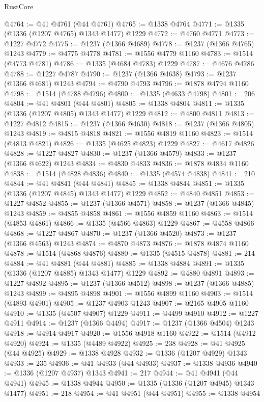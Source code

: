 \begin{lexlean}{RustCore}
\begin{coremodule}
@4764 := @41 @4761 (@44 @4761)
@4765 := @1338 @4764
@4771 := @1335 (@1336 (@1207 @4765) @1343 @1477) @1229
@4772 := @4760 @4771
@4773 := @1227 @4772
@4775 := @1237 (@1366 @4689)
@4778 := @1237 (@1366 @4765) @1243
@4779 := @4775 @4778
@4781 := @1556 @4779 @1160
@4783 := @1514 (@4773 @4781)
@4786 := @1335 (@4684 @4783) @1229
@4787 := @4676 @4786
@4788 := @1227 @4787
@4790 := @1237 (@1366 @4638)
@4793 := @1237 (@1366 @4681) @1243
@4794 := @4790 @4793
@4796 := @1878 @4794 @1160
@4798 := @1514 (@4788 @4796)
@4800 := @1335 (@4633 @4798)
@4801 := 206
@4804 := @41 @4801 (@44 @4801)
@4805 := @1338 @4804
@4811 := @1335 (@1336 (@1207 @4805) @1343 @1477) @1229
@4812 := @4800 @4811
@4813 := @1227 @4812
@4815 := @1237 (@1366 @4630)
@4818 := @1237 (@1366 @4805) @1243
@4819 := @4815 @4818
@4821 := @1556 @4819 @1160
@4823 := @1514 (@4813 @4821)
@4826 := @1335 (@4625 @4823) @1229
@4827 := @4617 @4826
@4828 := @1227 @4827
@4830 := @1237 (@1366 @4579)
@4833 := @1237 (@1366 @4622) @1243
@4834 := @4830 @4833
@4836 := @1878 @4834 @1160
@4838 := @1514 (@4828 @4836)
@4840 := @1335 (@4574 @4838)
@4841 := 210
@4844 := @41 @4841 (@44 @4841)
@4845 := @1338 @4844
@4851 := @1335 (@1336 (@1207 @4845) @1343 @1477) @1229
@4852 := @4840 @4851
@4853 := @1227 @4852
@4855 := @1237 (@1366 @4571)
@4858 := @1237 (@1366 @4845) @1243
@4859 := @4855 @4858
@4861 := @1556 @4859 @1160
@4863 := @1514 (@4853 @4861)
@4866 := @1335 (@4566 @4863) @1229
@4867 := @4558 @4866
@4868 := @1227 @4867
@4870 := @1237 (@1366 @4520)
@4873 := @1237 (@1366 @4563) @1243
@4874 := @4870 @4873
@4876 := @1878 @4874 @1160
@4878 := @1514 (@4868 @4876)
@4880 := @1335 (@4515 @4878)
@4881 := 214
@4884 := @41 @4881 (@44 @4881)
@4885 := @1338 @4884
@4891 := @1335 (@1336 (@1207 @4885) @1343 @1477) @1229
@4892 := @4880 @4891
@4893 := @1227 @4892
@4895 := @1237 (@1366 @4512)
@4898 := @1237 (@1366 @4885) @1243
@4899 := @4895 @4898
@4901 := @1556 @4899 @1160
@4903 := @1514 (@4893 @4901)
@4905 := @1237 @4903 @1243
@4907 := @2165 @4905 @1160
@4910 := @1335 (@4507 @4907) @1229
@4911 := @4499 @4910
@4912 := @1227 @4911
@4914 := @1237 (@1366 @4494)
@4917 := @1237 (@1366 @4504) @1243
@4918 := @4914 @4917
@4920 := @1556 @4918 @1160
@4922 := @1514 (@4912 @4920)
@4924 := @1335 (@4489 @4922)
@4925 := 238
@4928 := @41 @4925 (@44 @4925)
@4929 := @1338 @4928
@4932 := @1336 (@1207 @4929) @1343
@4933 := 235
@4936 := @41 @4933 (@44 @4933)
@4937 := @1338 @4936
@4940 := @1336 (@1207 @4937) @1343
@4941 := 217
@4944 := @41 @4941 (@44 @4941)
@4945 := @1338 @4944
@4950 := @1335 (@1336 (@1207 @4945) @1343 @1477)
@4951 := 218
@4954 := @41 @4951 (@44 @4951)
@4955 := @1338 @4954

\end{coremodule}
\end{lexlean}
